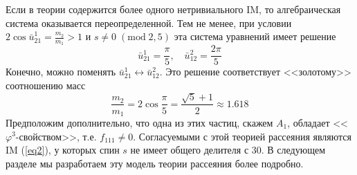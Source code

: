 \documentclass[12pt]{article}
\theoremstyle{definition}
\begin{document}
Если в теории содержится более одного нетривиального IM, то алгебраическая система оказывается переопределенной. Тем не менее, при условии $2\cos\bar{u}^1_{21}=\frac{m_2}{m_1}>1$ и $s\neq 0\;(\text{mod}\;2,5)$ эта система уравнений имеет решение
\begin{equation}
    \bar{u}^1_{21}=\frac{\pi}{5},\quad \bar{u}^2_{12}=\frac{2\pi}{5}
\end{equation}
Конечно, можно поменять $\bar{u}^1_{21}\leftrightarrow \bar{u}^2_{12}$. Это решение соответствует <<золотому>> соотношению масс
\begin{equation}\label{eq22}
    \frac{m_2}{m_1}=2\cos\frac{\pi}{5}=\frac{\sqrt{5}+1}{2}\approx 1.618
\end{equation}
Предположим дополнительно, что одна из этих частиц, скажем $A_1$, обладает <<$\varphi^3$-свойством>>, т.е. $f_{111}\neq0$. Согласуемыми с этой теорией рассеяния являются IM (\ref{eq2}), у которых спин $s$ не имеет общего делителя с 30. В следующем разделе мы разработаем эту модель теории рассеяния более подробно.
\end{document}
